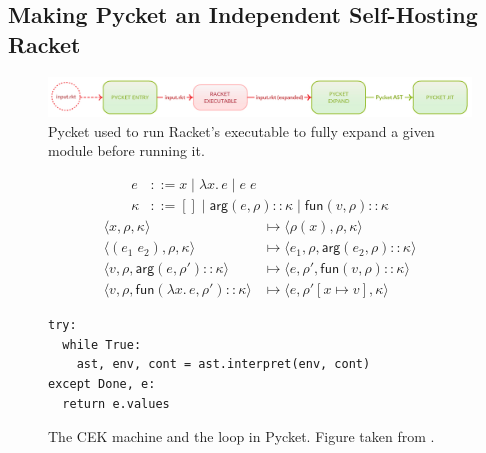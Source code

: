 \subsection{Making Pycket an Independent Self-Hosting Racket}
\label{subsec:pycket}

\begin{figure}[h!]
  \centering \includegraphics[scale=0.3]{img/old-pycket-yatay}
\caption{Pycket used to run Racket's executable to fully expand a given module before running it.}
\label{fig:old-pycket}
\end{figure}

\vspace{-0.25cm}

\begin{figure}
  \vspace{-0.8cm}
  \small
\begin{align*}
e &::= x \mid \lambda x.\, e \mid e \; e\\
\kappa &::= [] \mid \mathsf{arg}(e,\rho){::}\kappa \mid \mathsf{fun}(v,\rho){::}\kappa
\end{align*}
\begin{align*}
\langle x, \rho, \kappa \rangle & \longmapsto
    \langle \rho(x), \rho, \kappa \rangle \\
\langle (e_1 \; e_2), \rho, \kappa \rangle & \longmapsto
    \langle e_1, \rho, \mathsf{arg}(e_2, \rho){::}\kappa \rangle \\
\langle v, \rho, \mathsf{arg}(e,\rho'){::}\kappa \rangle & \longmapsto
    \langle e, \rho', \mathsf{fun}(v,\rho){::}\kappa \rangle \\
\langle v, \rho, \mathsf{fun}(\lambda x. \, e, \rho'){::}\kappa \rangle & \longmapsto
    \langle e, \rho'[x\mapsto v], \kappa \rangle
\end{align*}
\begin{lstlisting}[mathescape]
try:
  while True:
    ast, env, cont = ast.interpret(env, cont)
except Done, e:
  return e.values
\end{lstlisting}
\caption{The CEK machine and the loop in Pycket. Figure taken from \cite{pycket15}.}
\label{fig:cek}
\end{figure}

